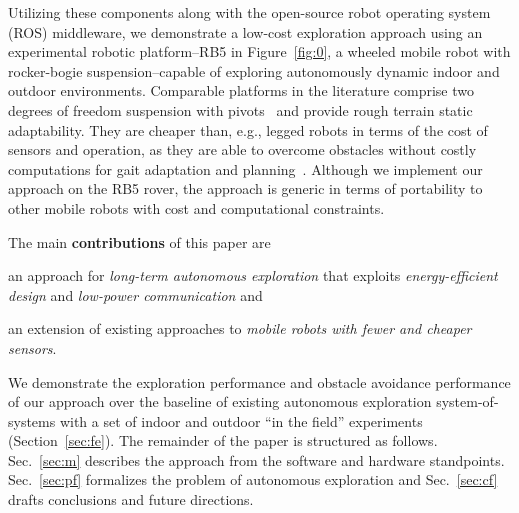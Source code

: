 \documentclass[lettersize,journal,twoside]{IEEEtran}
\theoremstyle{definition}
\begin{document}
Utilizing these components along with the open-source robot operating system (ROS) middleware, we %
demonstrate a low-cost %
exploration approach %
using an experimental robotic platform--RB5 in Figure~\ref{fig:0}, a wheeled mobile robot with rocker-bogie suspension--capable of exploring autonomously dynamic indoor and outdoor environments.
Comparable platforms in the literature comprise two degrees of freedom suspension with pivots~\cite{setterfield2013terrain,%
faisal2021low} and provide rough terrain static adaptability. %
They are cheaper than, e.g., legged robots in terms of the cost of sensors %
and operation, as they are able to overcome obstacles without costly computations for gait adaptation and planning~\cite{muller2021openbot}.
Although %
we implement our approach on the RB5 rover, %
the approach is generic in terms of portability to other mobile robots with cost and computational constraints.

The main \textbf{contributions} of this paper are
\begin{enumerate*}[label={(\alph*)},font={\textit}]
\item an approach for \textit{long-term autonomous exploration} that exploits \textit{energy-efficient design} and \textit{low-power communication} and
\item an extension of %
existing %
approaches to \textit{mobile robots with fewer and cheaper sensors}.
\end{enumerate*}
We demonstrate the exploration performance and obstacle avoidance performance of our approach  
over the baseline of existing autonomous exploration system-of-systems with a set of indoor and outdoor ``in the field'' experiments (Section~\ref{sec:fe}). 
The remainder of the paper is structured as follows.
Sec.~\ref{sec:m} describes the approach from the software and hardware standpoints. %
Sec.~\ref{sec:pf} formalizes the problem of autonomous exploration and Sec.~\ref{sec:cf} drafts conclusions %
and future directions.
\end{document}
